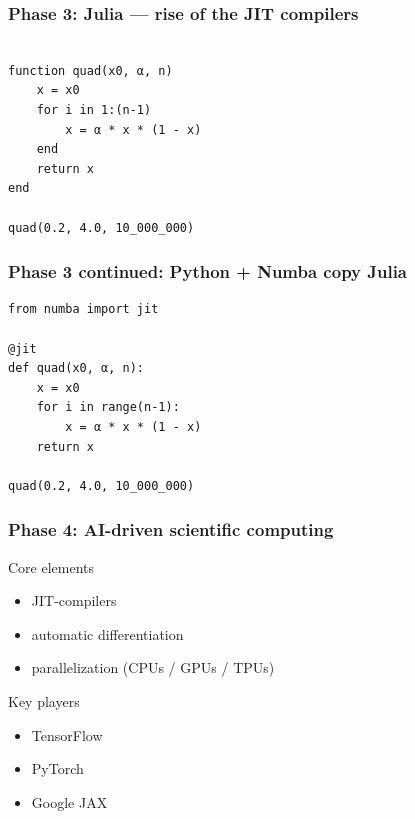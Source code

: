 \documentclass[
    xcolor={svgnames,dvipsnames},
    hyperref={colorlinks, citecolor=DeepPink4, linkcolor=DarkRed, urlcolor=DarkBlue}
    ]{beamer}  %
\newcommand{\1}{\mathbbm 1}
\begin{document}
\begin{frame}[fragile]
    \frametitle{Phase 3: Julia --- rise of the JIT compilers}
    
    \begin{verbatim}

function quad(x0, α, n)
    x = x0
    for i in 1:(n-1)
        x = α * x * (1 - x)
    end
    return x
end

quad(0.2, 4.0, 10_000_000)
    \end{verbatim}

\end{frame}


\begin{frame}[fragile]
    \frametitle{Phase 3 continued: Python + Numba copy Julia}
    
    \begin{verbatim}
from numba import jit

@jit
def quad(x0, α, n):
    x = x0
    for i in range(n-1):
        x = α * x * (1 - x)
    return x

quad(0.2, 4.0, 10_000_000)
    \end{verbatim}

\end{frame}

\begin{frame}
    \frametitle{Phase 4: AI-driven scientific computing}

    Core elements
    \begin{itemize}
        \item JIT-compilers
        \vspace{0.5em}
        \item automatic differentiation
        \vspace{0.5em}
        \item parallelization (CPUs / GPUs / TPUs)
    \end{itemize}

    Key players
    \begin{itemize}
        \item TensorFlow
        \vspace{0.5em}
        \item PyTorch
        \vspace{0.5em}
        \item Google JAX
        \vspace{0.5em}
    \end{itemize}
    
\end{frame}
\end{document}
